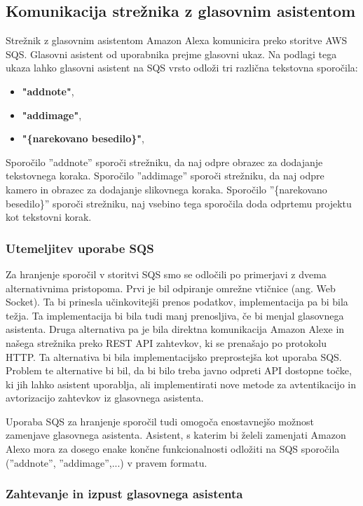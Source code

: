 \documentclass[a4paper, 12pt]{book}
\begin{document}
\subsection{Komunikacija strežnika z glasovnim asistentom}

Strežnik z glasovnim asistentom Amazon Alexa komunicira preko storitve AWS SQS.
Glasovni asistent od uporabnika prejme glasovni ukaz.
Na podlagi tega ukaza lahko glasovni asistent na SQS vrsto odloži tri različna tekstovna sporočila:
\begin{itemize}
	\item \textbf{"addnote"},
	\item \textbf{"addimage"},
	\item \textbf{"\{narekovano besedilo\}"},
\end{itemize}

Sporočilo ''addnote'' sporoči strežniku, da naj odpre obrazec za dodajanje tekstovnega koraka.
Sporočilo ''addimage'' sporoči strežniku, da naj odpre kamero in obrazec za dodajanje slikovnega koraka.
Sporočilo ''\{narekovano besedilo\}'' sporoči strežniku, naj vsebino tega sporočila doda odprtemu projektu kot tekstovni korak.

\subsubsection{Utemeljitev uporabe SQS}
Za hranjenje sporočil v storitvi SQS smo se odločili po primerjavi z dvema alternativnima pristopoma.
Prvi je bil odpiranje omrežne vtičnice (ang. Web Socket).
Ta bi prinesla učinkovitejši prenos podatkov, implementacija pa bi bila težja.
Ta implementacija bi bila tudi manj prenosljiva, če bi menjal glasovnega asistenta.
Druga alternativa pa je bila direktna komunikacija Amazon Alexe in našega strežnika preko REST API zahtevkov, ki se prenašajo po protokolu HTTP.
Ta alternativa bi bila implementacijsko preprostejša kot uporaba SQS.
Problem te alternative bi bil, da bi bilo treba javno odpreti API dostopne točke, ki jih lahko asistent uporablja, ali implementirati nove metode za avtentikacijo in avtorizacijo zahtevkov iz glasovnega asistenta.

Uporaba SQS za hranjenje sporočil tudi omogoča enostavnejšo možnost zamenjave glasovnega asistenta.
Asistent, s katerim bi želeli zamenjati Amazon Alexo mora za dosego enake končne funkcionalnosti odložiti na SQS sporočila (''addnote'', ''addimage'',...) v pravem formatu.

\subsubsection{Zahtevanje in izpust glasovnega asistenta}
\end{document}
